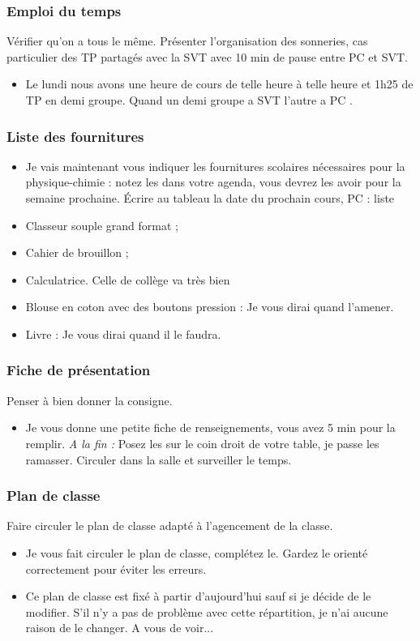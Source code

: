 \subsubsection*{Emploi du temps}
Vérifier qu'on a tous le même.
Présenter l'organisation des sonneries, cas particulier des TP partagés avec la SVT avec 10 min de pause entre PC et SVT.
\begin{itemize}
\item \og Le lundi nous avons une heure de cours de telle heure à telle heure et 1h25 de TP en demi groupe.
Quand un demi groupe a SVT l'autre a PC .\fg{}
\end{itemize}

\subsubsection*{Liste des fournitures}
\begin{itemize}
\item \og Je vais maintenant vous indiquer les fournitures scolaires nécessaires pour la physique-chimie : notez les dans votre agenda, vous devrez les avoir pour la semaine prochaine. \fg{}
Écrire au tableau la date du prochain cours, PC : liste
\item Classeur souple grand format ;
\item Cahier de brouillon ;
\item Calculatrice. Celle de collège va très bien
\item Blouse en coton avec des boutons pression : \og Je vous dirai quand l'amener. \fg{}
\item Livre : \og Je vous dirai quand il le faudra. \fg{}
\end{itemize}

\subsubsection*{Fiche de présentation}
Penser à bien donner la consigne.
\begin{itemize}
\item \og Je vous donne une petite fiche de renseignements, vous avez 5 min pour la remplir. \textit{A la fin :} Posez les sur le coin droit de votre table, je passe les ramasser. \fg{} Circuler dans la salle et surveiller le temps.
\end{itemize}

\subsubsection*{Plan de classe}
Faire circuler le plan de classe adapté à l'agencement de la classe.
\begin{itemize}
\item \og Je vous fait circuler le plan de classe, complétez le. Gardez le orienté correctement pour éviter les erreurs. \fg{}
\item \og Ce plan de classe est fixé à partir d'aujourd'hui sauf si je décide de le modifier.
S'il n'y a pas de problème avec cette répartition, je n'ai aucune raison de le changer.
A vous de voir... \fg{} 
\end{itemize}

